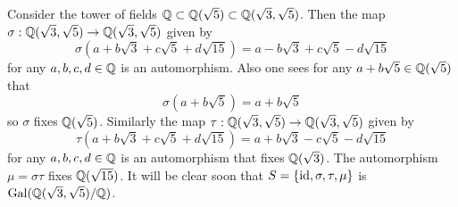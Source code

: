 \begin{example}\label{example-galois-group-of-Q-sqrt3-sqrt5-over-Q}
    Consider the tower of fields $\mathbb{Q} \subset \mathbb{Q}(\sqrt5) \subset \mathbb{Q}(\sqrt3, \sqrt5)$. Then the map $\sigma: \mathbb{Q}(\sqrt3,\sqrt5) \to \mathbb{Q}(\sqrt3,\sqrt5)$ given by
    \[
        \sigma(a + b\sqrt3 + c\sqrt5 + d\sqrt{15}) = a - b\sqrt3 + c\sqrt5 - d\sqrt{15}
    \]
    for any $a,b,c,d \in \mathbb{Q}$ is an automorphism. Also one sees for any $a + b\sqrt5 \in \mathbb{Q}(\sqrt5)$ that
    \[
        \sigma(a + b\sqrt{5}) = a+b\sqrt5
    \]
    so $\sigma$ fixes $\mathbb{Q}(\sqrt5)$. Similarly the map $\tau: \mathbb{Q}(\sqrt3,\sqrt5)\to\mathbb{Q}(\sqrt3,\sqrt5)$ given by
    \[
        \tau(a + b\sqrt3 + c\sqrt5 + d\sqrt{15}) = a + b\sqrt3 - c\sqrt5 - d\sqrt{15}
    \]
    for any $a,b,c,d \in \mathbb{Q}$ is an automorphism that fixes $\mathbb{Q}(\sqrt3)$. The automorphism $\mu = \sigma\tau$ fixes $\mathbb{Q}(\sqrt{15})$. It will be clear soon that $S = \{\mathrm{id}, \sigma, \tau, \mu\}$ is $\mathrm{Gal}(\mathbb{Q}(\sqrt3,\sqrt5)/\mathbb{Q})$.


\end{example}

